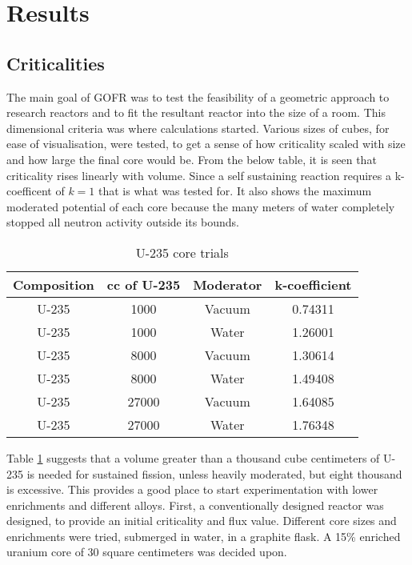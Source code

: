 \section{Results}
\label{sec:results}

\subsection{Criticalities}

The main goal of GOFR was to test the feasibility of a geometric approach to research reactors and to fit the resultant reactor into the size of a room. This dimensional criteria was where calculations started. Various sizes of cubes, for ease of visualisation, were tested, to get a sense of how criticality scaled with size and how large the final core would be. From the below table, it is seen that criticality rises linearly with volume. Since a self sustaining reaction requires a k-coefficent of $k=1$ that is what was tested for. It also shows the maximum moderated potential of each core because the many meters of water completely stopped all neutron activity outside its bounds.

\begin{table}[!htbp]
\centering
\caption{U-235 core trials}
\label{tab:pureU}
\begin{tabular}{|c|c|c|c|}
\hline
Composition & cc of U-235 		& Moderator	& k-coefficient  \\
\hline
U-235  		&  1000             & Vacuum	& 0.74311     \\
\hline
U-235  		&  1000             & Water     & 1.26001     \\
\hline
U-235  		&  8000             & Vacuum    & 1.30614     \\
\hline
U-235  		&  8000             & Water     & 1.49408     \\
\hline
U-235  		& 27000             & Vacuum    & 1.64085     \\
\hline
U-235  		& 27000             & Water     & 1.76348     \\
\hline
\end{tabular}
\end{table}

Table \ref{tab:pureU} suggests that a volume greater than a thousand cube centimeters of U-235 is needed for sustained fission, unless heavily moderated, but eight thousand is excessive. This provides a good place to start experimentation with lower enrichments and different alloys. First, a conventionally designed reactor was designed, to provide an initial criticality and flux value. Different core sizes and enrichments were tried, submerged in water, in a graphite flask. A 15\% enriched uranium core of 30 square centimeters was decided upon.

